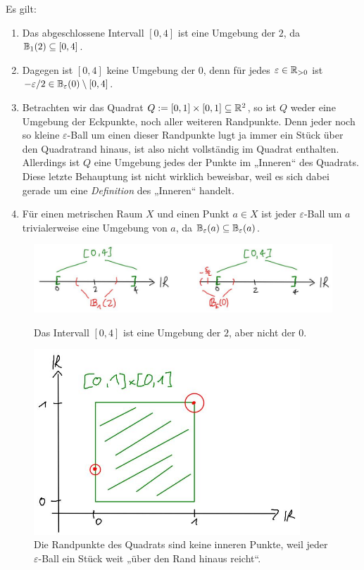 \begin{bsp}
    Es gilt:
    \begin{enumerate}
        \item Das abgeschlossene Intervall $[0,4]$ ist eine Umgebung der $2$, da $\mathbb B_1(2)\subseteq [0,4]$.
        \item Dagegen ist $[0,4]$ keine Umgebung der $0$, denn für jedes $\varepsilon\in\mathbb R_{>0}$ ist $-\varepsilon/2 \in \mathbb B_\varepsilon(0)\setminus [0,4]$.
        \item Betrachten wir das Quadrat $Q:=[0,1]\times [0,1]\subseteq \mathbb R^2$, so ist $Q$ weder eine Umgebung der Eckpunkte, noch aller weiteren Randpunkte. Denn jeder noch so kleine $\varepsilon$-Ball um einen dieser Randpunkte lugt ja immer ein Stück über den Quadratrand hinaus, ist also nicht vollständig im Quadrat enthalten. Allerdings ist $Q$ eine Umgebung jedes der Punkte im „Inneren“ des Quadrats. Diese letzte Behauptung ist nicht wirklich beweisbar, weil es sich dabei gerade um eine \emph{Definition} des „Inneren“ handelt.
        \item Für einen metrischen Raum $X$ und einen Punkt $a\in X$ ist jeder $\varepsilon$-Ball um $a$ trivialerweise eine Umgebung von $a$, da $\mathbb B_\varepsilon(a)\subseteq\mathbb B_\varepsilon(a)$.
    \end{enumerate}
    \begin{figure}[ht!]
        \includegraphics[width=\textwidth]{./_img/Intervallpunkte.jpeg}
        \centering \caption{Das Intervall $[0,4]$ ist eine Umgebung der $2$, aber nicht der $0$.}
        \includegraphics[width=10cm]{./_img/Quadratpunkte.jpeg}
        \centering \caption{Die Randpunkte des Quadrats sind keine inneren Punkte, weil jeder $\varepsilon$-Ball ein Stück weit „über den Rand hinaus reicht“.}
    \end{figure}
\end{bsp}


